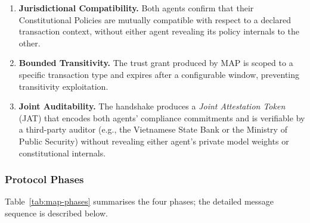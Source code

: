 \begin{enumerate}
  \item \textbf{Jurisdictional Compatibility.}  Both agents confirm that
        their Constitutional Policies are mutually compatible with respect
        to a declared transaction context, without either agent revealing
        its policy internals to the other.

  \item \textbf{Bounded Transitivity.}  The trust grant produced by MAP
        is scoped to a specific transaction type and expires after a
        configurable window, preventing transitivity exploitation.

  \item \textbf{Joint Auditability.}  The handshake produces a
        \emph{Joint Attestation Token} (JAT) that encodes both agents'
        compliance commitments and is verifiable by a third-party auditor
        (e.g., the Vietnamese State Bank or the Ministry of Public
        Security) without revealing either agent's private model weights
        or constitutional internals.
\end{enumerate}

\subsubsection*{Protocol Phases}

Table~\ref{tab:map-phases} summarises the four phases; the detailed
message sequence is described below.

